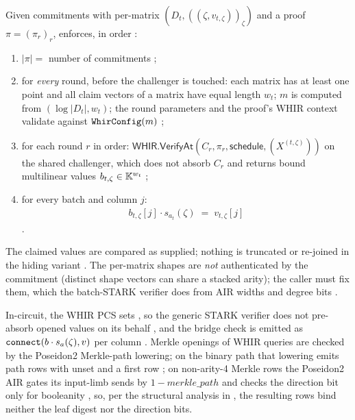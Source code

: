 \begin{definition}[Verification]
\label{def:ps-verify}
Given commitments with per-matrix $(D_t, ((\zeta, v_{t,\zeta}))_{\zeta})$ and a
proof $\pi = (\pi_r)_r$,  enforces, in order
:
\begin{enumerate}
\item $|\pi| = $ number of commitments ;
\item for \emph{every} round, before the challenger is touched: each matrix has
  at least one point and all claim vectors of a matrix have equal length $w_t$;
  $m$ is computed from $(\log|D_t|, w_t)$; the round parameters and the proof's
  WHIR context validate against $\texttt{WhirConfig}(m)$ ;
\item for each round $r$ in order: $\mathsf{WHIR.VerifyAt}(C_r, \pi_r,
  \mathsf{schedule}, (X^{(t,\zeta)}))$ on the shared challenger, which does not
  absorb $C_r$ and returns bound multilinear values $b_{t,\zeta} \in \mathbb{K}^{w_t}$
  ;
\item for every batch and column $j$:
  \begin{align}
    b_{t,\zeta}[j]\cdot s_{a_t}(\zeta) \;=\; v_{t,\zeta}[j]
  \end{align}
  .
\end{enumerate}
The claimed values are compared as supplied; nothing is truncated or re-joined
in the hiding variant . The per-matrix shapes are
\emph{not} authenticated by the commitment (distinct shape vectors can share a
stacked arity); the caller must fix them, which the batch-STARK verifier does from
AIR widths and degree bits .
\end{definition}

In-circuit, the WHIR PCS sets , so the
generic STARK verifier does not pre-absorb opened values on its behalf
,
and the bridge check is emitted as
$\texttt{connect}(b\cdot s_a(\zeta), v)$ per column
.
Merkle openings of WHIR queries are checked by the Poseidon2 Merkle-path
lowering; on the binary path that lowering emits path rows with
 unset and a  first row
; on non-arity-4 Merkle
rows the Poseidon2 AIR gates its input-limb sends by $1-\mathit{merkle\_path}$ and
checks the direction bit only for booleanity
, so,
per the structural analysis in , the resulting rows bind neither
the leaf digest nor the direction bits.

